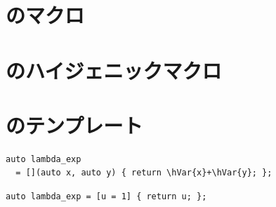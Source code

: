 \documentclass[a5paper,twoside,fleqn,draft]{jsbook}
\begin{document}
\section{\commonlisp のマクロ}

\section{\scheme のハイジェニックマクロ}

\section{\cxx のテンプレート}





\cxxfourteen
\begin{verbatim}
auto lambda_exp
  = [](auto x, auto y) { return \hVar{x}+\hVar{y}; };
\end{verbatim}

\begin{verbatim}
auto lambda_exp = [u = 1] { return u; };
\end{verbatim}
\end{document}
